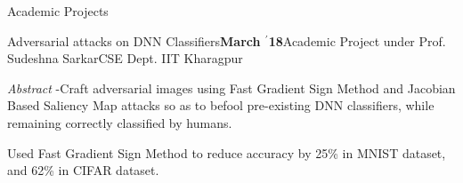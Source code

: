 \documentclass{resume} %
\begin{document}
\begin{rSection}{Academic Projects}



\begin{rSubsection}{ \large Adversarial attacks on DNN Classifiers}{\textbf{\large March $^{\prime}$18}}{Academic Project under Prof. Sudeshna Sarkar}{CSE Dept. IIT Kharagpur}

\item \textit{Abstract} -Craft adversarial images using Fast Gradient Sign Method and Jacobian Based Saliency Map attacks so as to befool pre-existing DNN classifiers, while remaining correctly classified by humans. 
\item Used Fast Gradient Sign Method to reduce accuracy by 25\% in MNIST dataset, and 62\% in CIFAR dataset.
\end{rSubsection}


\end{rSection}
\end{document}

